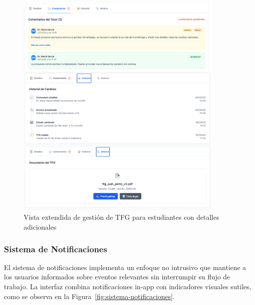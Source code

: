 \documentclass[12pt,a4paper,oneside]{report}
\begin{document}
\begin{figure}[H]
\centering
\includegraphics[width=0.9\textwidth]{processed/images/tfg-estudiante-extendido.png}
\caption{Vista extendida de gestión de TFG para estudiantes con detalles adicionales}
\label{fig:tfg-estudiante-extendido}
\end{figure}

\subsubsection{Sistema de Notificaciones}\label{sistema-de-notificaciones}

El sistema de notificaciones implementa un enfoque no intrusivo que mantiene a los usuarios informados sobre eventos relevantes sin interrumpir su flujo de trabajo. La interfaz combina notificaciones in-app con indicadores visuales sutiles, como se observa en la Figura~\ref{fig:sistema-notificaciones}.
\end{document}
